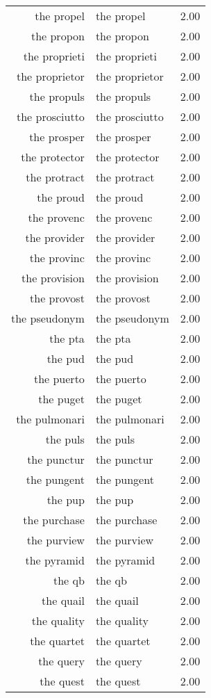 \begin{table}[ht]
\begin{tabular}{rlr}
  the propel & the propel & 2.00 \\ 
  the propon & the propon & 2.00 \\ 
  the proprieti & the proprieti & 2.00 \\ 
  the proprietor & the proprietor & 2.00 \\ 
  the propuls & the propuls & 2.00 \\ 
  the prosciutto & the prosciutto & 2.00 \\ 
  the prosper & the prosper & 2.00 \\ 
  the protector & the protector & 2.00 \\ 
  the protract & the protract & 2.00 \\ 
  the proud & the proud & 2.00 \\ 
  the provenc & the provenc & 2.00 \\ 
  the provider & the provider & 2.00 \\ 
  the provinc & the provinc & 2.00 \\ 
  the provision & the provision & 2.00 \\ 
  the provost & the provost & 2.00 \\ 
  the pseudonym & the pseudonym & 2.00 \\ 
  the pta & the pta & 2.00 \\ 
  the pud & the pud & 2.00 \\ 
  the puerto & the puerto & 2.00 \\ 
  the puget & the puget & 2.00 \\ 
  the pulmonari & the pulmonari & 2.00 \\ 
  the puls & the puls & 2.00 \\ 
  the punctur & the punctur & 2.00 \\ 
  the pungent & the pungent & 2.00 \\ 
  the pup & the pup & 2.00 \\ 
  the purchase & the purchase & 2.00 \\ 
  the purview & the purview & 2.00 \\ 
  the pyramid & the pyramid & 2.00 \\ 
  the qb & the qb & 2.00 \\ 
  the quail & the quail & 2.00 \\ 
  the quality & the quality & 2.00 \\ 
  the quartet & the quartet & 2.00 \\ 
  the query & the query & 2.00 \\ 
  the quest & the quest & 2.00 \\ 

\end{tabular}
\end{table}
